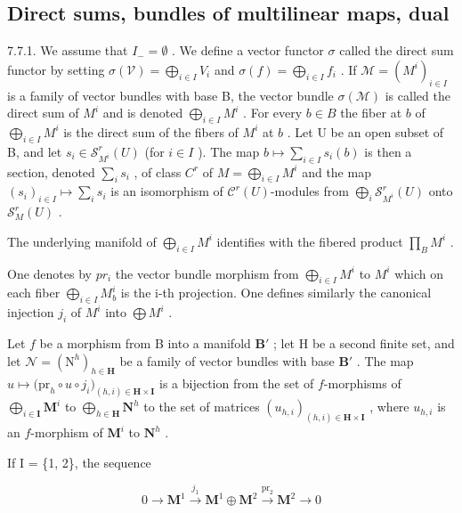 \subsection{Direct sums, bundles of multilinear maps, dual}

7.7.1. We assume that \(I_{-} = \emptyset\) . We define a vector functor \(\sigma\) called the direct sum functor by setting \(\sigma(\mathcal{V}) = \bigoplus_{i \in I} V_i\) and \(\sigma(f) = \bigoplus_{i \in I} f_i\) . If \(\mathcal{M} = (M^i)_{i \in I}\) is a family of vector bundles with base B, the vector bundle \(\sigma(\mathcal{M})\) is called the direct sum of \(M^i\) and is denoted \(\bigoplus_{i \in I} M^i\) . For every \(b \in B\) the fiber at \(b\) of \(\bigoplus_{i \in I} M^i\) is the direct sum of the fibers of \(M^i\) at \(b\) . Let U be an open subset of B, and let \(s_i \in \mathscr{S}_{M^i}^r(U)\) (for \(i \in I\) ). The map \(b \mapsto \sum_{i \in I} s_i(b)\) is then a section, denoted \(\sum_{i} s_i\) , of class \(C^r\) of \(M = \bigoplus_{i \in I} M^i\) and the map \((s_i)_{i \in I} \mapsto \sum_{i} s_i\) is an isomorphism of \(\mathscr{C}^r(U)\)-modules from \(\bigoplus_{i} \mathscr{S}_{M^i}^r(U)\) onto \(\mathscr{S}_M^r(U)\) .

The underlying manifold of \(\bigoplus_{i\in I}M^{i}\) identifies with the fibered product \(\prod_{B}M^{i}\) .

One denotes by \(pr_{i}\) the vector bundle morphism from \(\bigoplus_{i\in I} M^{i}\) to \(M^{i}\) which on each fiber \(\bigoplus_{i\in I} M_{b}^{i}\) is the i-th projection. One defines similarly the canonical injection \(j_{i}\) of \(M^{i}\) into \(\bigoplus M^{i}\) .

Let \(f\) be a morphism from B into a manifold \(\mathbf{B}'\) ; let H be a second finite set, and let \(\mathcal{N} = (\mathrm{N}^{h})_{h\in \mathbf{H}}\) be a family of vector bundles with base \(\mathbf{B}'\) . The map \(u\mapsto \bigl(\mathrm{pr}_{h}\circ u\circ j_{i}\bigr)_{(h,i)\in \mathbf{H}\times \mathbf{I}}\) is a bijection from the set of \(f\)-morphisms of \(\bigoplus_{i\in \mathbf{I}}\mathbf{M}^i\) to \(\bigoplus_{h\in \mathbf{H}}\mathbf{N}^h\) to the set of matrices \((u_{h,i})_{(h,i)\in \mathbf{H}\times \mathbf{I}}\) , where \(u_{h,i}\) is an \(f\)-morphism of \(\mathbf{M}^i\) to \(\mathbf{N}^h\) .

If I = \{1, 2\}, the sequence

\[
0 \to \mathbf {M}^{1} \xrightarrow{j_{1}} \mathbf {M}^{1} \oplus \mathbf {M}^{2} \stackrel{\mathrm{pr}_{2}}{\to} \mathbf {M}^{2} \to 0
\]

